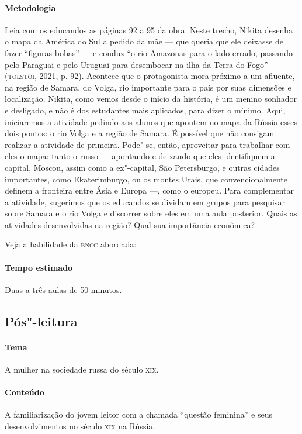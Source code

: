 \documentclass[11pt]{extarticle}
\begin{document}
\paragraph{Metodologia}
Leia com os educandos as páginas 92 a 95 da obra. Neste trecho, Nikita
desenha o mapa da América do Sul a pedido da mãe --- que queria que ele
deixasse de fazer ``figuras bobas'' --- e conduz ``o rio Amazonas para o
lado errado, passando pelo Paraguai e pelo Uruguai para desembocar na
ilha da Terra do Fogo'' (\textsc{tolstói}, 2021, p. 92). Acontece que o protagonista mora
próximo a um afluente, na região de Samara, do Volga, rio
importante para o país por suas dimensões e localização. Nikita,
como vemos desde o início da história, é um menino sonhador e desligado,
e não é dos estudantes mais aplicados, para dizer o mínimo. Aqui,
iniciaremos a atividade pedindo aos alunos que apontem no mapa da Rússia
esses dois pontos: o rio Volga e a região de Samara. É possível que não
consigam realizar a atividade de primeira. Pode"-se, então, aproveitar
para trabalhar com eles o mapa: tanto o russo --- apontando e deixando
que eles identifiquem a capital, Moscou, assim como a ex"-capital, São
Petersburgo, e outras cidades importantes, como Ekaterimburgo, ou os
montes Urais, que convencionalmente definem a fronteira entre Ásia e
Europa ---, como o europeu. Para complementar a atividade, sugerimos que
os educandos se dividam em grupos para pesquisar sobre Samara e o rio
Volga e discorrer sobre eles em uma aula posterior. Quais as atividades
desenvolvidas na região? Qual sua importância econômica?

Veja a habilidade da \textsc{bncc} abordada:


\paragraph{Tempo estimado} Duas a três aulas de 50 minutos.


\subsection{Pós"-leitura}

\paragraph{Tema} A mulher na sociedade russa do século \textsc{xix}.

\paragraph{Conteúdo}
A familiarização do jovem leitor com a chamada ``questão feminina'' e
seus desenvolvimentos no século \textsc{xix} na Rússia.
\end{document}
